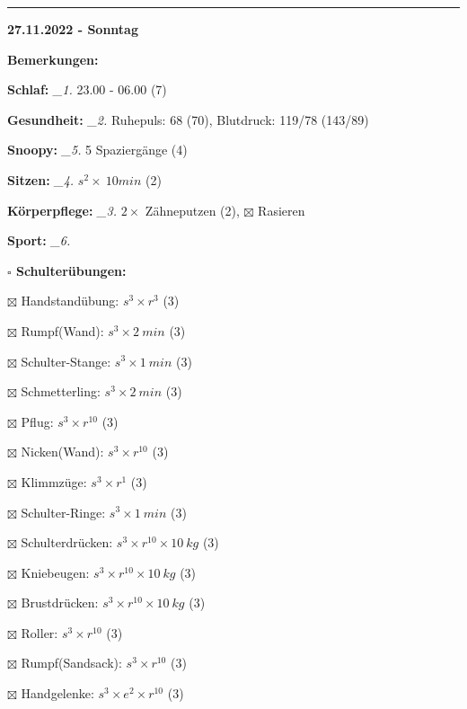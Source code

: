 \documentclass[10pt,a4paper]{article}
\newcommand\prop[1] {{\color {alizarin} {\bf #1}}}             %
\newcommand\rele[1] {{\color {english} \bf {#1}}}              %
\newcommand\mand[1] {{\color {burntorange} {\bf #1}}}          %
\newcommand\ddivide {\vskip -9pt \hrule \vskip 6pt}
\newcommand\topspace{\vskip -15pt \hskip 20pt}
\newcommand\n[1] { {\sl #1.} \hskip 5pt }
\begin{document}
\ddivide
{\rele {27.11.2022 - Sonntag}}

\begin{mdframed}[style=daystyle]
  \begin{labeling}{{\mand {Bemerkungen:}}}
    \setlength\itemsep{-3pt}
  \item[{\mand {Schlaf:}}]        \n{\_1} 23.00 - 06.00 (7)
  \item[{\mand {Gesundheit:}}]    \n{\_2} Ruhepuls: 68 (70), Blutdruck: 119/78 (143/89)
  \item[{\mand {Snoopy:}}]        \n{\_5} 5 Spaziergänge (4)
  \item[{\mand {Sitzen:}}]        \n{\_4} $s^2 \times\ 10 min$ (2)
  \item[{\mand {Körperpflege:}}]  \n{\_3} $2 \times$ Zähneputzen (2), $\boxtimes$ Rasieren
  \item[{\mand {Sport:}}]         \n{\_6}
    \topspace
    \begin{minipage}{0.75\textwidth}  
      \begin{labeling}{\prop {$\square$ {Schulterübungen:}}} 
        \setlength\itemsep{-3pt}
      \item[$\boxtimes$ Handstandübung:]  $s^3 \times r^{3}$ (3)
      \item[$\boxtimes$ Rumpf(Wand):]     $s^3 \times 2\ min$ (3)
      \item[$\boxtimes$ Schulter-Stange:] $s^3 \times 1\ min$ (3)
      \item[$\boxtimes$ Schmetterling:]   $s^3 \times 2\ min$ (3)
      \item[$\boxtimes$ Pflug:]           $s^3 \times r^{10}$ (3)
      \item[$\boxtimes$ Nicken(Wand):]    $s^3 \times r^{10}$ (3)
      \item[$\boxtimes$ Klimmzüge:]       $s^3 \times r^1$ (3)
      \item[$\boxtimes$ Schulter-Ringe:]  $s^3 \times 1\ min$ (3)
      \item[$\boxtimes$ Schulterdrücken:] $s^3 \times r^{10} \times 10\ kg$ (3)
      \item[$\boxtimes$ Kniebeugen:]      $s^3 \times r^{10} \times 10\ kg$ (3)
      \item[$\boxtimes$ Brustdrücken:]    $s^3 \times r^{10} \times 10\ kg$ (3)
      \item[$\boxtimes$ Roller:]          $s^3 \times r^{10}$ (3)
      \item[$\boxtimes$ Rumpf(Sandsack):] $s^3 \times r^{10}$ (3)
      \item[$\boxtimes$ Handgelenke:]     $s^3 \times e^2 \times r^{10}$ (3)

\end{labeling}
\end{minipage}
\end{labeling}
\end{mdframed}
\end{document}
